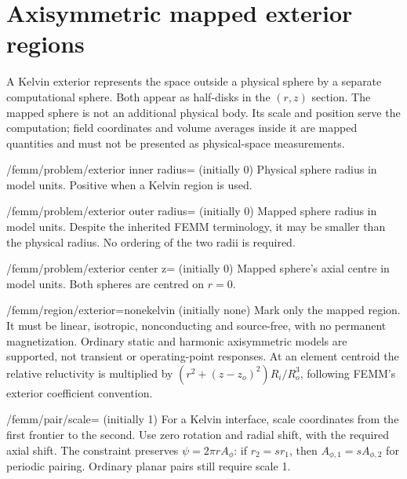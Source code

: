 \section{Axisymmetric mapped exterior regions}
\label{sec:exterior}

A Kelvin exterior represents the space outside a physical sphere by a separate
computational sphere. Both appear as half-disks in the $(r,z)$ section. The
mapped sphere is not an additional physical body. Its scale and position serve
the computation; field coordinates and volume averages inside it are mapped
quantities and must not be presented as physical-space measurements.

\begin{key}{/femm/problem/exterior inner radius= (initially 0)}
Physical sphere radius in model units. Positive when a Kelvin region is used.
\end{key}
\begin{key}{/femm/problem/exterior outer radius= (initially 0)}
Mapped sphere radius in model units. Despite the inherited FEMM terminology,
it may be smaller than the physical radius. No ordering of the two radii is required.
\end{key}
\begin{key}{/femm/problem/exterior center z= (initially 0)}
Mapped sphere's axial centre in model units. Both spheres are centred on $r=0$.
\end{key}
\begin{key}{/femm/region/exterior=none\textbar kelvin (initially none)}
Mark only the mapped region. It must be linear, isotropic, nonconducting and
source-free, with no permanent magnetization. Ordinary static and harmonic
axisymmetric models are supported, not transient or operating-point responses.
At an element centroid the relative reluctivity is multiplied by
$(r^2+(z-z_o)^2)R_i/R_o^3$, following FEMM's exterior coefficient convention.
\end{key}
\begin{key}{/femm/pair/scale= (initially 1)}
For a Kelvin interface, scale coordinates from the first frontier to the second.
Use zero rotation and radial shift, with the required axial shift. The constraint
preserves $\psi=2\pi rA_\phi$: if $r_2=s r_1$, then $A_{\phi,1}=s A_{\phi,2}$
for periodic pairing. Ordinary planar pairs still require scale 1.
\end{key}

